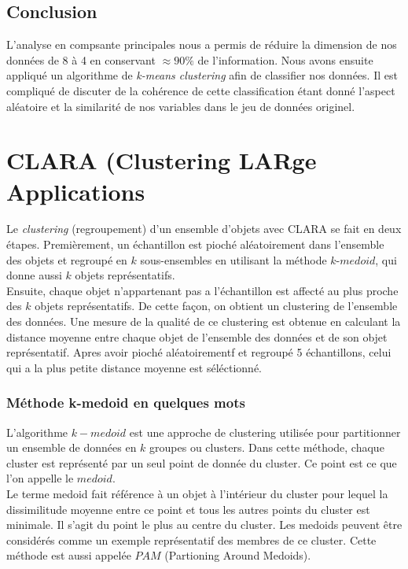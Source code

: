 \documentclass[11pt]{article}
\begin{document}
\subsection{Conclusion}
L'analyse en compsante principales nous a permis de réduire la dimension de nos données de 8 à 4 en conservant $\approx 90\% $ de l'information. Nous avons ensuite appliqué un algorithme de \emph{k-means clustering} afin de classifier nos données. Il est compliqué de discuter de la cohérence de cette classification étant donné l'aspect aléatoire et la similarité de nos variables dans le jeu de données originel. 
\newpage
\section{CLARA (Clustering LARge Applications}
Le \emph{clustering} (regroupement) d'un ensemble d'objets avec CLARA se fait en deux étapes. Premièrement, un échantillon est pioché aléatoirement dans l'ensemble des objets et regroupé en $k$ sous-ensembles en utilisant la méthode $k$-$medoid$, qui donne aussi $k$ objets représentatifs.\\
Ensuite, chaque objet n'appartenant pas a l'échantillon est affecté au plus proche des $k$ objets représentatifs. De cette façon, on obtient un clustering de l'ensemble des données. Une mesure de la qualité de ce clustering est obtenue en calculant la distance moyenne entre chaque objet de l'ensemble des données et de son objet représentatif. Apres avoir pioché aléatoirementf et regroupé 5 échantillons, celui qui a la plus petite distance moyenne est séléctionné.

\subsubsection{Méthode k-medoid en quelques mots}
L'algorithme $k-medoid$ est une approche de clustering utilisée pour partitionner un ensemble de données en $k$ groupes ou clusters. Dans cette méthode, chaque cluster est représenté par un seul point de donnée du cluster. Ce point est ce que l'on appelle le $medoid$.\\
Le terme medoid fait référence à un objet à l'intérieur du cluster pour lequel la dissimilitude moyenne entre ce point et tous les autres points du cluster est minimale. Il s'agit du point le plus au centre du cluster. Les medoids peuvent être considérés comme un exemple représentatif des membres de ce cluster.
Cette méthode est aussi appelée $PAM$ (Partioning Around Medoids).\\
\end{document}
